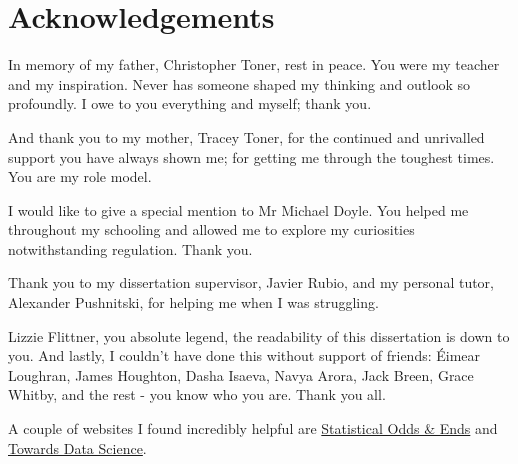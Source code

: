 \section*{Acknowledgements}

In memory of my father, Christopher Toner, rest in peace. You were my teacher and my inspiration. Never has someone shaped my thinking and outlook so profoundly. I owe to you everything and myself; thank you.

And thank you to my mother, Tracey Toner, for the continued and unrivalled support you have always shown me; for getting me through the toughest times. You are my role model.

I would like to give a special mention to Mr Michael Doyle. You helped me throughout my schooling and allowed me to explore my curiosities notwithstanding regulation. Thank you.

Thank you to my dissertation supervisor, Javier Rubio, and my personal tutor, Alexander Pushnitski, for helping me when I was struggling. 

Lizzie Flittner, you absolute legend, the readability of this dissertation is down to you. And lastly, I couldn't have done this without support of friends: \'Eimear Loughran, James Houghton, Dasha Isaeva, Navya Arora, Jack Breen, Grace Whitby, and the rest - you know who you are. Thank you all.

A couple of websites I found incredibly helpful are \hyperlink{https://statisticaloddsandends.wordpress.com/}{Statistical Odds \& Ends} and \hyperlink{https://towardsdatascience.com/}{Towards Data Science}.
